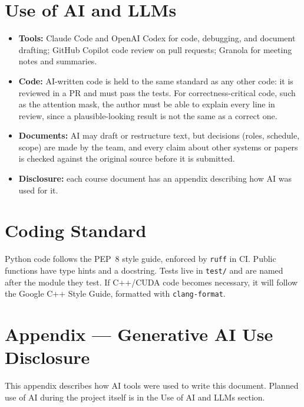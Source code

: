 \documentclass{article}
\begin{document}
\section{Use of AI and LLMs}

\begin{itemize}
  \item \textbf{Tools:} Claude Code and OpenAI Codex for code, debugging,
  and document drafting; GitHub Copilot code review on pull requests;
  Granola for meeting notes and summaries.
  \item \textbf{Code:} AI-written code is held to the same standard as any
  other code: it is reviewed in a PR and must pass the tests. For
  correctness-critical code, such as the attention mask, the author must
  be able to explain every line in review, since a plausible-looking
  result is not the same as a correct one.
  \item \textbf{Documents:} AI may draft or restructure text, but decisions
  (roles, schedule, scope) are made by the team, and every claim about
  other systems or papers is checked against the original source before
  it is submitted.
  \item \textbf{Disclosure:} each course document has an appendix
  describing how AI was used for it.
\end{itemize}

\section{Coding Standard}
\label{sec:standard}

Python code follows the PEP~8 style guide, enforced by \texttt{ruff} in CI.
Public functions
have type hints and a docstring. Tests live in \texttt{test/} and are named
after the module they test. If C++/CUDA code becomes necessary, it will
follow the Google C++ Style Guide, formatted with \texttt{clang-format}.




\newpage{}

\section{Appendix --- Generative AI Use Disclosure}

This appendix describes how AI tools were used to write this document.
Planned use of AI during the project itself is in the Use of AI and LLMs
section.
\end{document}

